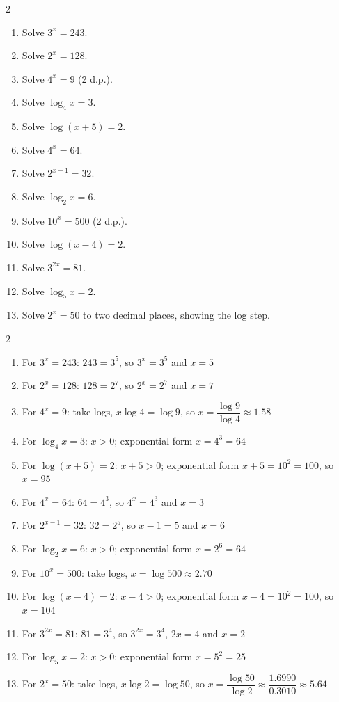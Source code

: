 \documentclass[11pt]{article}
\begin{document}
\begin{recapbox}
\begin{multicols}{2}
\small
\begin{enumerate}[leftmargin=*,itemsep=3pt]
  \item Solve $3^x=243$.
  \item Solve $2^x=128$.
  \item Solve $4^x=9$ (2 d.p.).
  \item Solve $\log_4 x=3$.
  \item Solve $\log(x+5)=2$.
  \item Solve $4^x=64$.
  \item Solve $2^{x-1}=32$.
  \item Solve $\log_2 x=6$.
  \item Solve $10^x=500$ (2 d.p.).
  \item Solve $\log(x-4)=2$.
  \item Solve $3^{2x}=81$.
  \item Solve $\log_5 x=2$.
  \item Solve $2^{x}=50$ to two decimal places, showing the log step.
\end{enumerate}
\end{multicols}
\end{recapbox}

\begin{keybox}
\begin{multicols}{2}
\small
\begin{enumerate}[leftmargin=*,itemsep=3pt]
  \item For $3^x=243$: $243=3^5$, so $3^x=3^5$ and $x=5$
  \item For $2^x=128$: $128=2^7$, so $2^x=2^7$ and $x=7$
  \item For $4^x=9$: take logs, $x\log4=\log9$, so $x=\dfrac{\log9}{\log4}\approx1.58$
  \item For $\log_4x=3$: $x>0$; exponential form $x=4^3=64$
  \item For $\log(x+5)=2$: $x+5>0$; exponential form $x+5=10^2=100$, so $x=95$
  \item For $4^x=64$: $64=4^3$, so $4^x=4^3$ and $x=3$
  \item For $2^{x-1}=32$: $32=2^5$, so $x-1=5$ and $x=6$
  \item For $\log_2x=6$: $x>0$; exponential form $x=2^6=64$
  \item For $10^x=500$: take logs, $x=\log500\approx2.70$
  \item For $\log(x-4)=2$: $x-4>0$; exponential form $x-4=10^2=100$, so $x=104$
  \item For $3^{2x}=81$: $81=3^4$, so $3^{2x}=3^4$, $2x=4$ and $x=2$
  \item For $\log_5x=2$: $x>0$; exponential form $x=5^2=25$
  \item For $2^x=50$: take logs, $x\log2=\log50$, so $x=\dfrac{\log50}{\log2}\approx\dfrac{1.6990}{0.3010}\approx5.64$
\end{enumerate}
\end{multicols}
\end{keybox}
\end{document}
